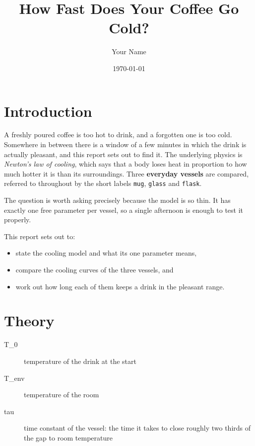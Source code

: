 \documentclass[a4paper,11pt]{article}
\title{How Fast Does Your Coffee Go Cold?}
\author{Your Name}
\date{\today}
\begin{document}
\maketitle
\tableofcontents

\section{Introduction}\label{sec:introduction}

A freshly poured coffee is too hot to drink, and a forgotten one is too cold.
Somewhere in between there is a window of a few minutes in which the drink is actually pleasant,
and this report sets out to find it.
The underlying physics is \emph{Newton's law of cooling},
which says that a body loses heat in proportion to how much hotter it is than its surroundings.
Three \textbf{everyday vessels} are compared,
referred to throughout by the short labels \texttt{mug}, \texttt{glass} and \texttt{flask}.

The question is worth asking precisely because the model is so thin.
It has exactly one free parameter per vessel,
so a single afternoon is enough to test it properly.

This report sets out to:

\begin{itemize}
    \item state the cooling model and what its one parameter means,
    \item compare the cooling curves of the three vessels, and
    \item work out how long each of them keeps a drink in the pleasant range.
\end{itemize}

\section{Theory}\label{sec:theory}


\begin{description}
    \item[T\_0] temperature of the drink at the start
    \item[T\_env] temperature of the room
    \item[tau] time constant of the vessel: the time it takes to close
        roughly two thirds of the gap to room temperature
\end{description}
\end{document}
